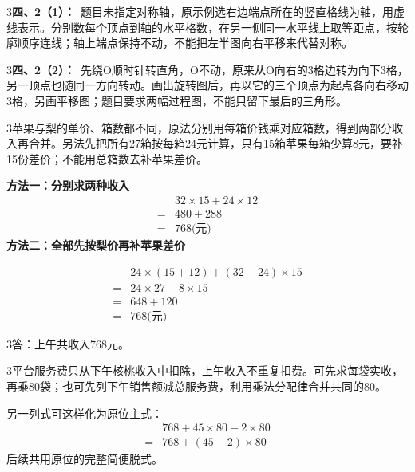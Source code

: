 \documentclass[multi=snippet,border={5bp 20bp 5bp 5bp}]{standalone}
\newenvironment{snippet}[3]{\begin{minipage}{#1bp}\color{answerred}\fontsize{#2}{#3}\selectfont\raggedright}{\end{minipage}}
\begin{document}
\begin{snippet}{505}{11.5}{14}\begin{multicols}{3}\raggedcolumns \textbf{四、2（1）：}\ 题目未指定对称轴，原示例选右边端点所在的竖直格线为轴，用虚线表示。分别数每个顶点到轴的水平格数，在另一侧同一水平线上取等距点，按轮廓顺序连线；轴上端点保持不动，不能把左半图向右平移来代替对称。\end{multicols}\end{snippet}
\begin{snippet}{505}{11.5}{14}\begin{multicols}{3}\raggedcolumns \textbf{四、2（2）：}\ 先绕O顺时针转直角，O不动，原来从O向右的3格边转为向下3格，另一顶点也随同一方向转动。画出旋转图后，再以它的三个顶点为起点各向右移动3格，另画平移图；题目要求两幅过程图，不能只留下最后的三角形。\end{multicols}\end{snippet}
\begin{snippet}{505}{11.5}{14}\begin{multicols}{3}\raggedcolumns 苹果与梨的单价、箱数都不同，原法分别用每箱价钱乘对应箱数，得到两部分收入再合并。另法先把所有27箱按每箱24元计算，只有15箱苹果每箱少算8元，要补15份差价；不能用总箱数去补苹果差价。\par \textbf{方法一：分别求两种收入}\[\begin{aligned} &32\times15+24\times12\\={}&480+288\\={}&768\text{(元)}\end{aligned}\]\textbf{方法二：全部先按梨价再补苹果差价}\end{multicols}\[\begin{aligned} &24\times(15+12)+(32-24)\times15\\={}&24\times27+8\times15\\={}&648+120\\={}&768\text{(元)}\end{aligned}\]\begin{multicols}{3}\raggedcolumns 答：上午共收入768元。\end{multicols}\end{snippet}
\begin{snippet}{505}{11.5}{14}\begin{multicols}{3}\raggedcolumns 平台服务费只从下午核桃收入中扣除，上午收入不重复扣费。可先求每袋实收，再乘80袋；也可先列下午销售额减总服务费，利用乘法分配律合并共同的80。\par 另一列式可这样化为原位主式：\[\begin{aligned}&768+45\times80-2\times80\\={}&768+(45-2)\times80\end{aligned}\]后续共用原位的完整简便脱式。\end{multicols}\end{snippet}
\end{document}
